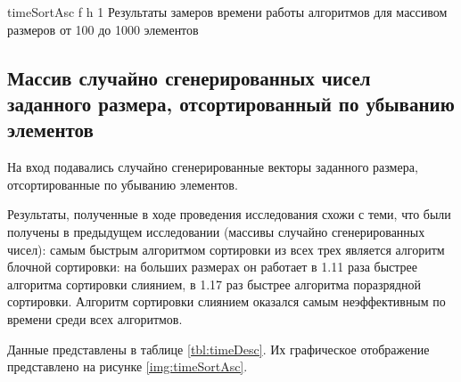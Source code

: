 {timeSortAsc} %
{f} %
{h} %
{1\textwidth} %
{Результаты замеров времени работы алгоритмов для массивом размеров от 100 до 1000 элементов} %

\clearpage

\subsection{Массив случайно сгенерированных чисел заданного размера, отсортированный по убыванию элементов}

На вход подавались случайно сгенерированные векторы заданного размера, отсортированные по убыванию элементов.

Результаты, полученные в ходе проведения исследования схожи с теми, что были получены в предыдущем исследовании (массивы случайно сгенерированных чисел):
самым быстрым алгоритмом сортировки из всех трех является алгоритм блочной сортировки: на больших размерах он работает в 1.11 раза быстрее алгоритма сортировки слиянием, в 1.17 раз быстрее алгоритма поразрядной сортировки. Алгоритм сортировки слиянием оказался самым неэффективным по времени среди всех алгоритмов.

Данные представлены в таблице \ref{tbl:timeDesc}. Их графическое отображение представлено на рисунке \ref{img:timeSortAsc}.

